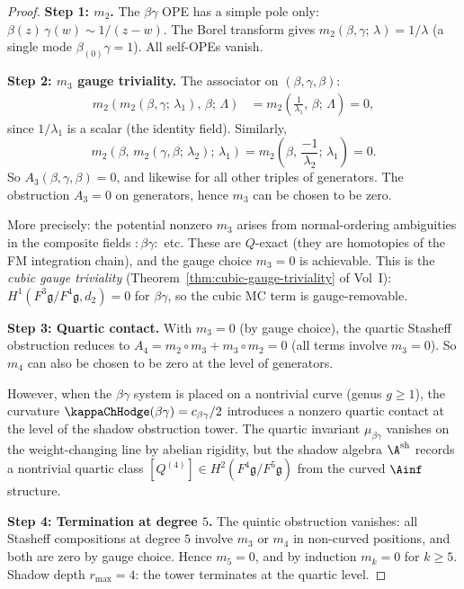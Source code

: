 \begin{proof}
\textbf{Step 1: $m_2$.}
The $\beta\gamma$ OPE has a simple pole only:
$\beta(z)\, \gamma(w) \sim 1/(z-w)$. The Borel
transform gives $m_2(\beta, \gamma;\, \lambda) = 1/\lambda$
(a single mode $\beta_{(0)}\gamma = 1$). All
self-OPEs vanish.

\medskip
\textbf{Step 2: $m_3$ gauge triviality.}
The associator on $(\beta, \gamma, \beta)$:
\begin{align*}
m_2(m_2(\beta,\gamma;\,\lambda_1),\, \beta;\, \Lambda)
&= m_2\!\left(\frac{1}{\lambda_1},\, \beta;\, \Lambda\right)
= 0,
\end{align*}
since $1/\lambda_1$ is a scalar (the identity field).
Similarly,
\[
m_2(\beta,\, m_2(\gamma,\beta;\,\lambda_2);\, \lambda_1)
= m_2\!\left(\beta,\, \frac{-1}{\lambda_2};\, \lambda_1\right)
= 0.
\]
So $A_3(\beta,\gamma,\beta) = 0$, and likewise for all
other triples of generators. The obstruction $A_3 = 0$
on generators, hence $m_3$ can be chosen to be zero.

More precisely: the potential nonzero $m_3$ arises from
normal-ordering ambiguities in the composite fields
$:\!\beta\gamma\!:$ etc. These are $Q$-exact (they
are homotopies of the FM integration chain), and
the gauge choice $m_3 = 0$ is achievable. This is the
\emph{cubic gauge triviality}
(Theorem~\ref*{thm:cubic-gauge-triviality} of Vol~I):
$H^1(F^3\mathfrak{g}/F^4\mathfrak{g}, d_2) = 0$ for
$\beta\gamma$, so the cubic MC term is gauge-removable.

\medskip
\textbf{Step 3: Quartic contact.}
With $m_3 = 0$ (by gauge choice), the quartic Stasheff
obstruction reduces to
$A_4 = m_2 \circ m_3 + m_3 \circ m_2 = 0$ (all terms
involve $m_3 = 0$). So $m_4$ can also be chosen to be
zero at the level of generators.

However, when the $\beta\gamma$ system is placed on a
nontrivial curve (genus $g \ge 1$), the curvature
$\kappaChHodge(\beta\gamma) = c_{\beta\gamma}/2$ introduces
a nonzero quartic contact at the level of the
shadow obstruction tower. The quartic invariant
$\mu_{\beta\gamma}$ vanishes on the weight-changing
line by abelian rigidity, but the shadow algebra
$\A^{\mathrm{sh}}$ records a nontrivial quartic class
$[Q^{(4)}] \in H^2(F^4\mathfrak{g}/F^5\mathfrak{g})$
from the curved $\Ainf$ structure.

\medskip
\textbf{Step 4: Termination at degree $5$.}
The quintic obstruction vanishes: all Stasheff compositions
at degree $5$ involve $m_3$ or $m_4$ in non-curved positions,
and both are zero by gauge choice. Hence $m_5 = 0$, and
by induction $m_k = 0$ for $k \ge 5$. Shadow depth
$r_{\max} = 4$: the tower terminates at the quartic level.
\end{proof}


